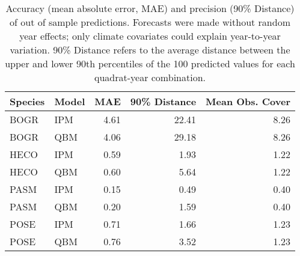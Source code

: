 \begin{table}[ht]
\centering
\caption{Accuracy (mean absolute error, MAE) and precision (90\% Distance) 
                  of out of sample predictions. Forecasts were made without random 
                  year effects; only climate covariates could explain year-to-year 
                  variation. 90\% Distance refers to the average distance between the 
                  upper and lower 90th percentiles of the 100 predicted values for 
                  each quadrat-year combination.} 
\begin{tabular}{llrrr}
  \hline
Species & Model & MAE & 90\% Distance & Mean Obs. Cover \\ 
  \hline
BOGR & IPM & 4.61 & 22.41 & 8.26 \\ 
  BOGR & QBM & 4.06 & 29.18 & 8.26 \\ 
  HECO & IPM & 0.59 & 1.93 & 1.22 \\ 
  HECO & QBM & 0.60 & 5.64 & 1.22 \\ 
  PASM & IPM & 0.15 & 0.49 & 0.40 \\ 
  PASM & QBM & 0.20 & 1.59 & 0.40 \\ 
  POSE & IPM & 0.71 & 1.66 & 1.23 \\ 
  POSE & QBM & 0.76 & 3.52 & 1.23 \\ 
   \hline
\end{tabular}
\end{table}
